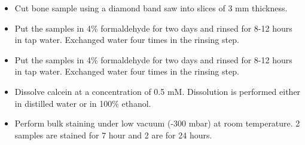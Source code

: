 \documentclass[10pt,a4paper]{Protocol}
\begin{document}






\begin{fullwidth}
\makeheader
\end{fullwidth}


\justifying
{}
\begin{itemize}
	\item Cut bone sample using a diamond band saw into slices of 3 mm thickness.
\end{itemize}
\divider

\begin{itemize}
	\item Put the samples in 4\% formaldehyde for two days and rinsed for 8-12 hours in tap water. Exchanged water four times in the rinsing step.
\end{itemize}
\divider

\begin{itemize}
	\item Put the samples in 4\% formaldehyde for two days and rinsed for 8-12 hours in tap water. Exchanged water four times in the rinsing step.
\end{itemize}
\divider

\begin{itemize}
	\item Dissolve calcein at a concentration of 0.5 mM. Dissolution is performed either in distilled water or in 100\% ethanol.
	\item Perform bulk staining under low vacuum (-300 mbar) at room temperature. 2 samples are stained for 7 hour and 2 are for 24 hours.
\end{itemize}
\divider
\end{document}
